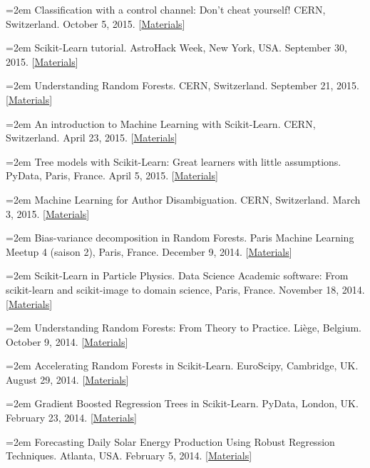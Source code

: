 \documentclass{scrartcl}
\newcommand{\MarginText}[1]{\marginpar{\raggedleft\itshape\small#1}}
\newcommand{\NewPublication}[4]{\noindent\hangindent=2em\hangafter=0 \MarginText{\color{black} #1}{\footnotesize [{\color{Maroon}#2}]} #3 {\footnotesize\color{gray}#4}\vspace{0.5em}}
\begin{document}
\begin{cv}{}
\NewPublication{}{18}{Classification with a control channel: Don't cheat yourself!}{%
CERN, Switzerland.
October 5, 2015.
[\href{https://github.com/glouppe/talk-classification-control-channel}{Materials}]}

\NewPublication{}{17}{Scikit-Learn tutorial.}{%
AstroHack Week, New York, USA.
September 30, 2015.
[\href{https://github.com/AstroHackWeek/AstroHackWeek2015}{Materials}]}

\NewPublication{}{16}{Understanding Random Forests.}{%
CERN, Switzerland.
September 21, 2015.
[\href{https://github.com/glouppe/talk-pydata2015}{Materials}]}

\NewPublication{}{15}{An introduction to Machine Learning with Scikit-Learn.}{%
CERN, Switzerland.
April 23, 2015.
[\href{https://github.com/glouppe/tutorial-sklearn-lhcb}{Materials}]}

\NewPublication{}{14}{Tree models with Scikit-Learn: Great learners with little assumptions.}{%
PyData, Paris, France.
April 5, 2015.
[\href{https://github.com/glouppe/talk-pydata2015}{Materials}]}

\NewPublication{}{13}{Machine Learning for Author Disambiguation.}{%
CERN, Switzerland.
March 3, 2015.
[\href{https://github.com/glouppe/talk-disambiguation-inspire}{Materials}]}

\NewPublication{2014}{12}{Bias-variance decomposition in Random Forests.}{%
Paris Machine Learning Meetup 4 (saison 2), Paris, France.
December 9, 2014.
[\href{http://hdl.handle.net/2268/174897}{Materials}]}

\NewPublication{}{11}{Scikit-Learn in Particle Physics.}{%
Data Science Academic software: From scikit-learn and scikit-image to domain science, Paris, France.
November 18, 2014.
[\href{https://github.com/glouppe/talk-cds2014}{Materials}]}

\NewPublication{}{10}{Understanding Random Forests: From Theory to Practice.}{%
Li{\`e}ge, Belgium.
October 9, 2014.
[\href{https://github.com/glouppe/phd-thesis}{Materials}]}

\NewPublication{}{9}{Accelerating Random Forests in Scikit-Learn.}{%
EuroScipy, Cambridge, UK.
August 29, 2014.
[\href{https://github.com/glouppe/talk-euroscipy2014}{Materials}]}

\NewPublication{}{8}{Gradient Boosted Regression Trees in Scikit-Learn.}{%
PyData, London, UK.
February 23, 2014.
[\href{https://github.com/glouppe/tutorial-pydata2014}{Materials}]}

\NewPublication{}{7}{Forecasting Daily Solar Energy Production Using Robust Regression Techniques.}{%
Atlanta, USA.
February 5, 2014.
[\href{http://hdl.handle.net/2268/162797}{Materials}]}


\end{cv}
\end{document}
